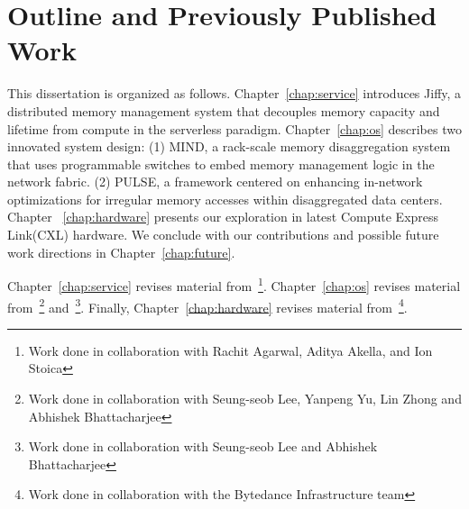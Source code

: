 \section{Outline and Previously Published Work}

This dissertation is organized as follows. Chapter~\ref{chap:service} introduces Jiffy, a distributed memory management system that decouples memory capacity and lifetime from compute in the serverless paradigm. Chapter~\ref{chap:os} describes two innovated system design: (1) MIND, a rack-scale memory disaggregation system that uses programmable switches to embed memory management logic in
the network fabric. (2) PULSE, a framework centered on enhancing in-network optimizations for
irregular memory accesses within disaggregated data centers. Chapter ~\ref{chap:hardware} presents our exploration in latest Compute Express Link(CXL) hardware. We conclude with our contributions and possible future work directions in Chapter~\ref{chap:future}.

Chapter~\ref{chap:service} revises material from~\cite{jiffy}\footnote{Work done in collaboration with Rachit Agarwal, Aditya Akella, and Ion Stoica}. Chapter~\ref{chap:os} revises material from~\cite{mind}\footnote{Work done in collaboration with Seung-seob Lee, Yanpeng Yu, Lin Zhong and Abhishek Bhattacharjee} and~\cite{chase}\footnote{Work done in collaboration with Seung-seob Lee and Abhishek Bhattacharjee}. Finally, Chapter~\ref{chap:hardware} revises material from~\cite{cxleurosys}\footnote{Work done in collaboration with the Bytedance Infrastructure team}.
